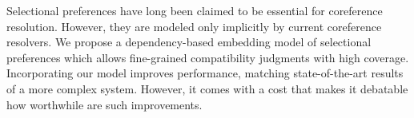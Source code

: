 Selectional preferences have long been claimed to be essential for coreference resolution. However, they are modeled only implicitly by current coreference resolvers. We propose a dependency-based embedding model of selectional preferences which allows fine-grained compatibility judgments with high coverage. Incorporating our model improves performance, matching state-of-the-art results of a more complex system. However, it comes with a cost that makes it debatable how worthwhile are such improvements.

